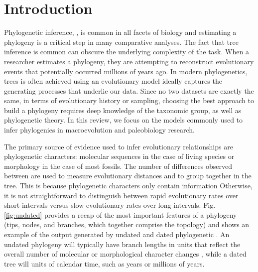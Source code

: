 
\section{Introduction}


Phylogenetic inference, , is common in all facets of biology and estimating a phylogeny is a critical step in many comparative analyses. The fact that tree inference is common can obscure the underlying complexity of the task.
When a researcher estimates a phylogeny, they are attempting to reconstruct evolutionary events that potentially occurred millions of years ago.
In modern phylogenetics,  trees is often achieved  using an evolutionary model  ideally captures the generating processes that underlie our data.
Since no two datasets are exactly the same, in terms of evolutionary history or  sampling, choosing the best approach to build a phylogeny requires deep knowledge of the taxonomic group, as well as phylogenetic theory.
In this review, we focus on the models commonly used to infer phylogenies in macroevolution and paleobiology research.

The primary source of evidence used to infer evolutionary relationships are phylogenetic characters: molecular sequences  in the case of living species or morphology in the case of most fossils.
The number of differences observed between  are used to measure evolutionary distances and to group  together in the tree.
This is because phylogenetic characters only contain information  %
Otherwise, it is not straightforward to distinguish between rapid evolutionary rates over short intervals versus slow evolutionary rates over long intervals.
Fig. \ref{fig:undated} provides a recap of the most important features of a phylogeny (tips, nodes, and branches, which together comprise the  topology) and shows an example of the output generated by undated and dated phylogenetic .
An undated phylogeny will typically have branch lengths in units that reflect the overall number of molecular or morphological character changes , while a dated tree will  units of calendar time, such as years or millions of years.

